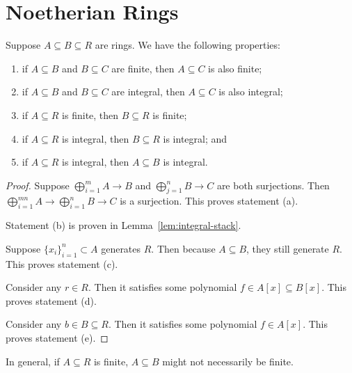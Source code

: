 \section{Noetherian Rings}

\begin{proposition}\label{prop:integral-finite-properties}
    Suppose \(A \subseteq B \subseteq R\) are rings.
    We have the following properties:
    \begin{enumerate}[label={(\alph*)}, itemsep=0mm]
        \item if \(A \subseteq B\) and \(B \subseteq C\) are finite, then \(A \subseteq C\) is also finite;
        \item if \(A \subseteq B\) and \(B \subseteq C\) are integral, then \(A \subseteq C\) is also integral;
        \item if \(A \subseteq R\) is finite, then \(B \subseteq R\) is finite;
        \item if \(A \subseteq R\) is integral, then \(B \subseteq R\) is integral; and
        \item if \(A \subseteq R\) is integral, then \(A \subseteq B\) is integral.
    \end{enumerate}
\end{proposition}
\begin{proof}
    Suppose \(\bigoplus_{i=1}^m A \to B\) and \(\bigoplus_{j=1}^n B \to C\) are both surjections.
    Then \(\bigoplus_{i=1}^{mn} A \to \bigoplus_{i=1}^n B \to C\) is a surjection.
    This proves statement (a).

    Statement (b) is proven in Lemma~\ref{lem:integral-stack}.

    Suppose \({\{x_i\}}_{i=1}^n \subset A\) generates \(R\).
    Then because \(A \subseteq B\), they still generate \(R\).
    This proves statement (c).

    Consider any \(r \in R\).
    Then it satisfies some polynomial \(f \in A[x] \subseteq B[x]\).
    This proves statement (d).

    Consider any \(b \in B \subseteq R\).
    Then it satisfies some polynomial \(f \in A[x]\).
    This proves statement (e).
\end{proof}
\begin{remark}
    In general, if \(A \subseteq R\) is finite, \(A \subseteq B\) might not necessarily be finite.
\end{remark}

